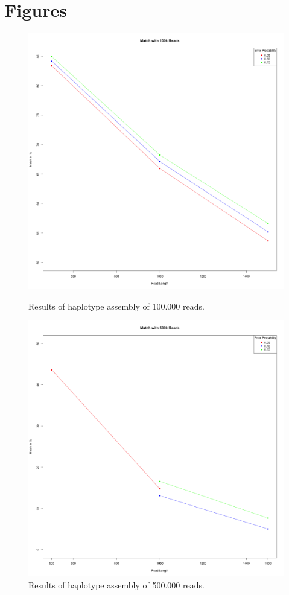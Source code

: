 \documentclass[10pt,a4paper]{article}
\begin{document}
\section{Figures}
\begin{figure}[!ht]
\centering
\includegraphics[height=0.4\textheight]{../output/plots/plot100k}
\caption{\footnotesize Results of haplotype assembly of 100.000 reads.}
\includegraphics[height=0.4\textheight]{../output/plots/plot500k}
\caption{\footnotesize Results of haplotype assembly of 500.000 reads.}
\end{figure}
\end{document}
